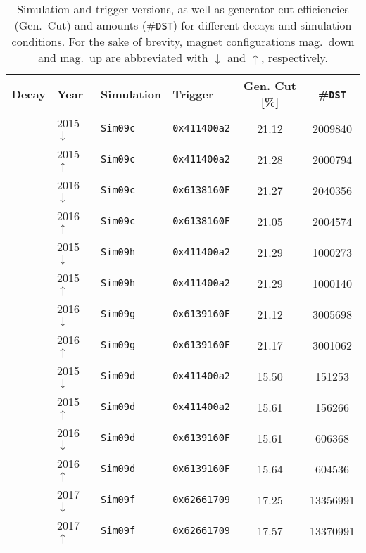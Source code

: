 \begin{table}[htbp]
    \centering
    \caption{Simulation and trigger versions, as well as generator cut efficiencies (Gen.\ Cut) and amounts (\#\texttt{DST}) for different decays and simulation conditions. For the sake of brevity, magnet configurations mag.\ down and mag.\ up are abbreviated with $\downarrow$ and $\uparrow$, respectively.}
    \label{tab:apdx_simtrig}
    \begin{tabular}{llllS[separate-uncertainty=false]S[table-format=8.0]}
        \toprule
        Decay & Year & Simulation & Trigger & {Gen. Cut [\%]} & {\#\texttt{DST}} \\
        \midrule
        \midrule
        \decay{\Lb}{\Dz\Lz} & 2015\,$\downarrow$ & \texttt{Sim09c} & \texttt{0x411400a2} & 21.12  & 2009840 \\
        & 2015\,$\uparrow$ & \texttt{Sim09c} & \texttt{0x411400a2} & 21.28  & 2000794 \\
        & 2016\,$\downarrow$ & \texttt{Sim09c} & \texttt{0x6138160F} & 21.27  & 2040356 \\
        & 2016\,$\uparrow$ & \texttt{Sim09c} & \texttt{0x6138160F} & 21.05  & 2004574 \\
        \midrule
        \decay{\Xibz}{\Dz\Lz} & 2015\,$\downarrow$ & \texttt{Sim09h} & \texttt{0x411400a2} & 21.29  & 1000273 \\
        & 2015\,$\uparrow$ & \texttt{Sim09h} & \texttt{0x411400a2} & 21.29  & 1000140 \\
        & 2016\,$\downarrow$ & \texttt{Sim09g} & \texttt{0x6139160F} & 21.12  & 3005698 \\
        & 2016\,$\uparrow$ & \texttt{Sim09g} & \texttt{0x6139160F} & 21.17  & 3001062 \\
        \midrule
        \decay{\Lb}{\Dz\proton\pim} & 2015\,$\downarrow$ & \texttt{Sim09d} & \texttt{0x411400a2} & 15.50  & 151253 \\
        & 2015\,$\uparrow$ & \texttt{Sim09d} & \texttt{0x411400a2} & 15.61  & 156266 \\
        & 2016\,$\downarrow$ & \texttt{Sim09d} & \texttt{0x6139160F} & 15.61  & 606368 \\
        & 2016\,$\uparrow$ & \texttt{Sim09d} & \texttt{0x6139160F} & 15.64  & 604536 \\
        & 2017\,$\downarrow$ & \texttt{Sim09f} & \texttt{0x62661709} & 17.25  & 13356991 \\
        & 2017\,$\uparrow$ & \texttt{Sim09f} & \texttt{0x62661709} & 17.57  & 13370991 \\

\end{tabular}
\end{table}
